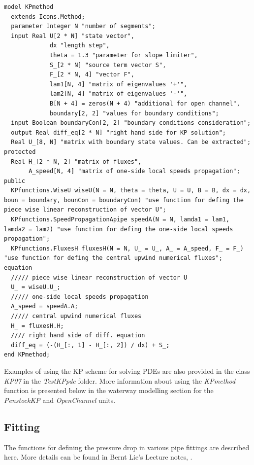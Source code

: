 \documentclass[%
]{USN-PhD}
\begin{document}
\begin{lstlisting}[language = modelica]
model KPmethod
  extends Icons.Method;
  parameter Integer N "number of segments";
  input Real U[2 * N] "state vector",
             dx "length step",
             theta = 1.3 "parameter for slope limiter",
             S_[2 * N] "source term vector S",
             F_[2 * N, 4] "vector F",
             lam1[N, 4] "matrix of eigenvalues '+'",
             lam2[N, 4] "matrix of eigenvalues '-'",
             B[N + 4] = zeros(N + 4) "additional for open channel",
             boundary[2, 2] "values for boundary conditions";
  input Boolean boundaryCon[2, 2] "boundary conditions consideration";
  output Real diff_eq[2 * N] "right hand side for KP solution";
  Real U_[8, N] "matrix with boundary state values. Can be extracted";
protected
  Real H_[2 * N, 2] "matrix of fluxes",
       A_speed[N, 4] "matrix of one-side local speeds propagation";
public
  KPfunctions.WiseU wiseU(N = N, theta = theta, U = U, B = B, dx = dx, boun = boundary, bounCon = boundaryCon) "use function for defing the piece wise linear reconstruction of vector U";
  KPfunctions.SpeedPropagationApipe speedA(N = N, lamda1 = lam1, lamda2 = lam2) "use function for defing the one-side local speeds propagation";
  KPfunctions.FluxesH fluxesH(N = N, U_ = U_, A_ = A_speed, F_ = F_) "use function for defing the central upwind numerical fluxes";
equation
  ///// piece wise linear reconstruction of vector U
  U_ = wiseU.U_;
  ///// one-side local speeds propagation
  A_speed = speedA.A;
  ///// central upwind numerical fluxes
  H_ = fluxesH.H;
  //// right hand side of diff. equation
  diff_eq = (-(H_[:, 1] - H_[:, 2]) / dx) + S_;
end KPmethod;
\end{lstlisting}

Examples of using the KP scheme for solving PDEs are also provided in the class \emph{KP07} in the \emph{TestKPpde} folder. More information about using the \emph{KPmethod} function is presented below in the waterway modelling section for the \emph{PenstockKP} and \emph{OpenChannel} units.

\subsection{Fitting}

The functions for defining the pressure drop in various pipe fittings are described here. More details can be found in Bernt Lie's Lecture notes, \cite{LieL:18}.
\end{document}
